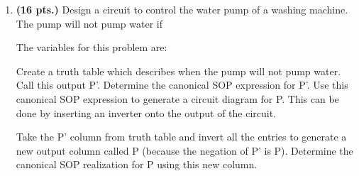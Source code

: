 \begin{enumerate}
\item{\bf (16 pts.)} Design a circuit to control
the water pump of a washing machine.  The pump will not pump 
water if
                                                                                
The variables for this problem are:
                                                                                
                                                                                
Create a truth table which describes when the pump will not
pump water.  Call this output P'.  Determine the canonical SOP
expression for P'.  Use this canonical SOP expression to generate
a circuit diagram for P.  This can be done by inserting an
inverter onto the output of the circuit.
                                                                                
Take the P' column from truth table and invert all the entries
to generate a new output column called P (because
the negation of P' is P).  Determine the canonical SOP
realization for P using this new column.
\end{enumerate}
